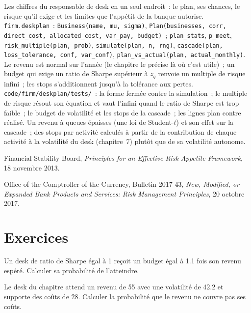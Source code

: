 \begin{build}
 Les chiffres du responsable de desk en un seul endroit~: le plan, ses chances, le risque qu'il exige et les limites que l'appétit de la banque autorise.
 \texttt{firm.deskplan}~: \texttt{Business(name, mu, sigma)},
\texttt{Plan(businesses, corr, direct\_cost, allocated\_cost, var\_pay, budget)}~; \texttt{plan\_stats}, \texttt{p\_meet}, \texttt{risk\_multiple(plan, prob)}, \texttt{simulate(plan, n, rng)},
\texttt{cascade(plan, loss\_tolerance, conf, var\_conf)}, \texttt{plan\_vs\_actual(plan, actual\_monthly)}.
 Le revenu est normal sur l'année (le chapitre le précise là où c'est utile)~; un budget qui exige un ratio de Sharpe supérieur à $z_q$ renvoie un
multiple de risque infini~; les stops s'additionnent jusqu'à la tolérance aux pertes.
 \texttt{code/firm/deskplan/tests/}~: la forme fermée contre la simulation~; le multiple de risque résout son équation et
vaut l'infini quand le ratio de Sharpe est trop faible~; le budget de volatilité et les stops de la cascade~; les lignes plan contre réalisé.
 Un revenu à queues épaisses (une loi de Student-$t$) et son effet sur la cascade~; des stops par activité calculés à partir de la contribution de chaque activité à la
volatilité du desk (chapitre~7) plutôt que de sa volatilité autonome.
\end{build}

\begin{omsources}
\item Financial Stability Board, \emph{Principles for an Effective Risk Appetite Framework}, 18 novembre 2013.
\item Office of the Comptroller of the Currency, Bulletin 2017-43, \emph{New, Modified, or Expanded Bank Products and Services: Risk Management
Principles}, 20 octobre 2017.
\end{omsources}

\section{Exercices}

\begin{exercise}[$\star$]\label{exo:fm:the-head-of-desks-job:1}
Un desk de ratio de Sharpe égal à 1 reçoit un budget égal à 1.1 fois son revenu espéré. Calculer sa probabilité de l'atteindre.
\end{exercise}

\begin{exercise}[$\star$]\label{exo:fm:the-head-of-desks-job:2}
Le desk du chapitre attend un revenu de 55 avec une volatilité de 42.2 et supporte des coûts de 28. Calculer la probabilité que le revenu ne couvre pas ses coûts.
\end{exercise}


